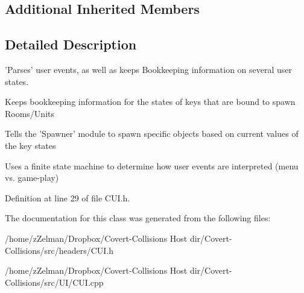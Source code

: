 \subsection*{Additional Inherited Members}


\subsection{Detailed Description}
'Parses' user events, as well as keeps Bookkeeping information on several user states. 

Keeps bookkeeping information for the states of keys that are bound to spawn Rooms/\-Units

Tells the 'Spawner' module to spawn specific objects based on current values of the key states

Uses a finite state machine to determine how user events are interpreted (menu vs. game-\/play) 

Definition at line 29 of file C\-U\-I.\-h.



The documentation for this class was generated from the following files\-:\begin{DoxyCompactItemize}
\item 
/home/z\-Zelman/\-Dropbox/\-Covert-\/\-Collisions Host dir/\-Covert-\/\-Collisions/src/headers/C\-U\-I.\-h\item 
/home/z\-Zelman/\-Dropbox/\-Covert-\/\-Collisions Host dir/\-Covert-\/\-Collisions/src/\-U\-I/C\-U\-I.\-cpp\end{DoxyCompactItemize}

